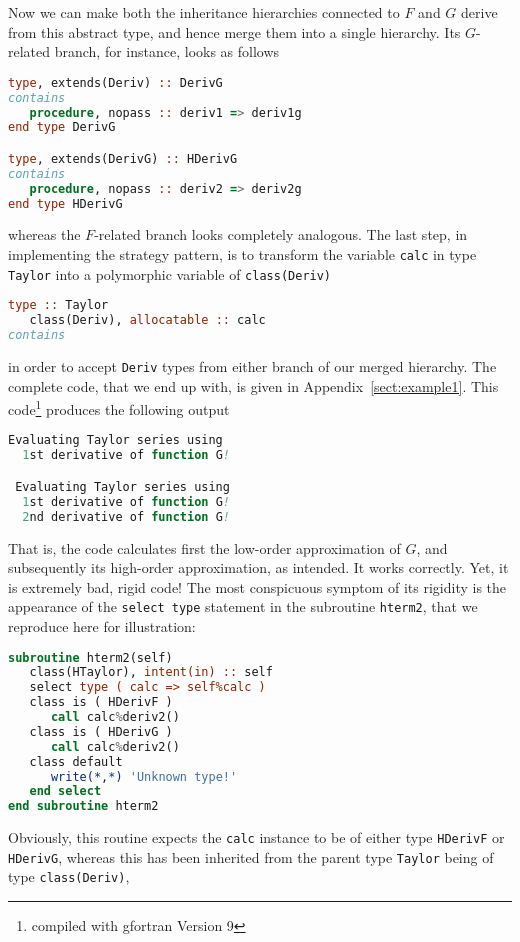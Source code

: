 \documentclass[11pt,oneside]{article}
\begin{document}
Now we can make both the inheritance hierarchies connected to $F$ and $G$
derive from this abstract type, and hence merge them into a single
hierarchy. Its $G$-related branch, for instance, looks as follows
\begin{lstlisting}[language=Fortran]
type, extends(Deriv) :: DerivG
contains
   procedure, nopass :: deriv1 => deriv1g
end type DerivG

type, extends(DerivG) :: HDerivG
contains
   procedure, nopass :: deriv2 => deriv2g
end type HDerivG
\end{lstlisting}
whereas the $F$-related branch looks completely analogous. The last
step, in implementing the strategy pattern, is to transform the variable
\texttt{calc} in type \texttt{Taylor} into a polymorphic variable of
\texttt{class(Deriv)}
\begin{lstlisting}[language=Fortran]
type :: Taylor
   class(Deriv), allocatable :: calc
contains
\end{lstlisting}
in order to accept \texttt{Deriv} types from either branch of our
merged hierarchy. The complete code, that we end up with, is given
in Appendix~\ref{sect:example1}. This code\footnote{compiled
  with gfortran Version 9} produces the following output
\begin{lstlisting}[language=Fortran]
 Evaluating Taylor series using
  1st derivative of function G!

 Evaluating Taylor series using
  1st derivative of function G!
  2nd derivative of function G!
\end{lstlisting}
That is, the code calculates first the low-order approximation of $G$,
and subsequently its high-order approximation, as intended. It works
correctly. Yet, it is extremely bad, rigid code! The most conspicuous
symptom of its rigidity is the appearance of the \texttt{select type}
statement in the subroutine \texttt{hterm2}, that we reproduce here for
illustration:
\begin{lstlisting}[language=Fortran]
subroutine hterm2(self)
   class(HTaylor), intent(in) :: self
   select type ( calc => self%calc )
   class is ( HDerivF )
      call calc%deriv2()
   class is ( HDerivG )
      call calc%deriv2()
   class default
      write(*,*) 'Unknown type!'
   end select
end subroutine hterm2
\end{lstlisting}
Obviously, this routine expects the \texttt{calc} instance to be of
either type \texttt{HDerivF} or \texttt{HDerivG}, whereas this has
been inherited from the parent type \texttt{Taylor} being of type
\texttt{class(Deriv)},
\end{document}
